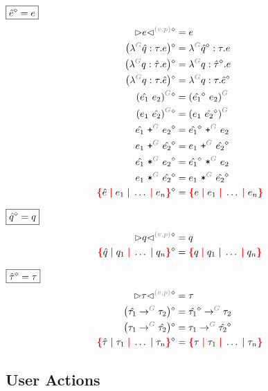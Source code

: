 \noindent $\boxed{\hat{e}\mathclose{}^{\diamond}\mathclose{} = e}$
%
\begin{align*}
  \erase{\cursor{v}{p}{e}} &= e \\
  \erase{\left(\eFun{G}{\Z{q}}{\tau}{e}\right)} &= \eFun{G}{\erase{\Z{q}}}{\tau}{e} \\
  \erase{\left(\eFun{G}{q}{\Z{\tau}}{e}\right)} &= \eFun{G}{q}{\erase{\Z{\tau}}}{e} \\
  \erase{\left(\eFun{G}{q}{\tau}{\Z{e}}\right)} &= \eFun{G}{q}{\tau}{\erase{\Z{e}}} \\
  \erase{\eApp{G}{\Z{e_1}}{e_2}} &= \eApp{G}{\erase{\Z{e_1}}}{e_2} \\
  \erase{\eApp{G}{e_1}{\Z{e_2}}} &= \eApp{G}{e_1}{\erase{\Z{e_2}}} \\
  \erase{\ePlus{G}{\Z{e_1}}{e_2}} &= \ePlus{G}{\erase{\Z{e_1}}}{e_2} \\
  \erase{\ePlus{G}{e_1}{\Z{e_2}}} &= \ePlus{G}{e_1}{\erase{\Z{e_2}}} \\
  \erase{\eTimes{G}{\Z{e_1}}{e_2}} &= \eTimes{G}{\erase{\Z{e_1}}}{e_2} \\
  \erase{\eTimes{G}{e_1}{\Z{e_2}}} &= \eTimes{G}{e_1}{\erase{\Z{e_2}}} \\
  \erase{\conflictHole{\Z{e}, e_1, \ldots, e_n}} &= \conflictHole{e, e_1, \ldots, e_n}
\end{align*}

\noindent $\boxed{\hat{q}\mathclose{}^{\diamond}\mathclose{} = q}$
%
\begin{align*}
  \erase{\cursor{v}{p}{q}} &= q \\
  \erase{\conflictHole{\Z{q}, q_1, \ldots, q_n}} &= \conflictHole{q, q_1, \ldots, q_n}
\end{align*}

\noindent $\boxed{\hat{\tau}\mathclose{}^{\diamond}\mathclose{} = \tau}$
%
\begin{align*}
  \erase{\cursor{v}{p}{\tau}} &= \tau \\
  \erase{\left(\tArrow{G}{\Z{\tau_1}}{\tau_2}\right)} &= \tArrow{G}{\erase{\Z{\tau_1}}}{\tau_2} \\
  \erase{\left(\tArrow{G}{\tau_1}{\Z{\tau_2}}\right)} &= \tArrow{G}{\tau_1}{\erase{\Z{\tau_2}}} \\
  \erase{\conflictHole{\Z{\tau}, \tau_1, \ldots, \tau_n}} &= \conflictHole{\tau, \tau_1, \ldots, \tau_n}
\end{align*}


\subsection{User Actions}


